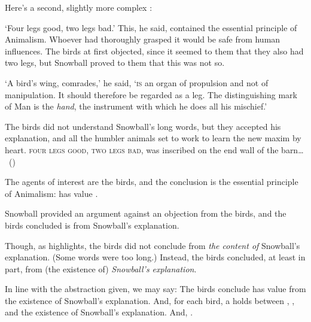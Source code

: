 \begin{note}
  Here's a second, slightly more complex :

  \begin{scenario}[Animalism]%
    \label{scen:animalism}%
    `Four legs good, two legs bad.'
    This, he said, contained the essential principle of Animalism.
    Whoever had thoroughly grasped it would be safe from human influences.
    The birds at first objected, since it seemed to them that they also had two legs, but Snowball proved to them that this was not so.

    `A bird's wing, comrades,' he said, `\textsc{is} an organ of propulsion and not of manipulation.
    It should therefore be regarded as a leg.
    The distinguishing mark of Man is the \emph{hand}, the instrument with which he does all his mischief.'

    The birds did not understand Snowball's long words, but they accepted his explanation, and all the humbler animals set to work to learn the new maxim by heart.
    \textsc{four legs good, two legs bad}, was inscribed on the end wall of the barn\dots%
    \mbox{ }\hfill\mbox{(\cite[25]{Orwell:1976aa})}%
    \newline
  \end{scenario}

  \noindent%
  The agents of interest are the birds, and the conclusion is the essential principle of Animalism:
   has value .

  Snowball provided an argument against an objection from the birds, and the birds concluded  is  from Snowball's explanation.

  Though, as \citeauthor{Orwell:1976aa} highlights, the birds did not conclude  from \emph{the content of} Snowball's explanation.
  (Some words were too long.)
  Instead, the birds concluded, at least in part, from (the existence of) \emph{Snowball's explanation}.

\end{note}

\begin{note}
  In line with the abstraction given, we may say:
  The birds conclude  has value  from the existence of Snowball's explanation.
  And, for each bird, a \ros{} holds between , , and the existence of Snowball's explanation.
  {
    \color{red}
    And, .
  }
\end{note}

